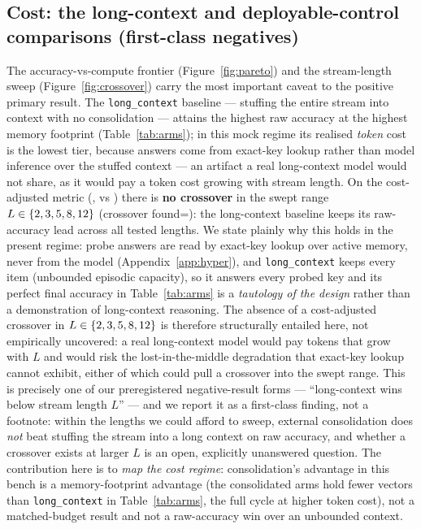 \subsection{Cost: the long-context and deployable-control comparisons (first-class negatives)}
The accuracy-vs-compute frontier (Figure~\ref{fig:pareto}) and the stream-length
sweep (Figure~\ref{fig:crossover}) carry the most important caveat to the
positive primary result. The \texttt{long\_context} baseline --- stuffing the
entire stream into context with no consolidation --- attains the highest raw
accuracy at the highest memory footprint (Table~\ref{tab:arms}); in this mock
regime its realised \emph{token} cost is the lowest tier, because answers come
from exact-key lookup rather than model inference over the stuffed context --- an
artifact a real long-context model would not share, as it would pay a token cost
growing with stream length. On the cost-adjusted metric
(\SWcrossoverMetric{}, \SWcrossoverTreatment{} vs \SWcrossoverBaseline{}) there
is \textbf{no crossover} in the swept range $L\in\{2, 3, 5, 8, 12\}$
(crossover found=\SWcrossoverFound): the long-context baseline keeps its
raw-accuracy lead across all tested lengths. We state plainly why this holds in
the present regime: probe answers are read by exact-key lookup over active memory,
never from the model (Appendix~\ref{app:hyper}), and \texttt{long\_context} keeps
every item (unbounded episodic capacity), so it answers every probed key and its
perfect final accuracy in Table~\ref{tab:arms} is a \emph{tautology of the design}
rather than a demonstration of long-context reasoning. The absence of a
cost-adjusted crossover in $L\in\{2, 3, 5, 8, 12\}$ is therefore structurally
entailed here, not empirically uncovered: a real long-context model would pay
tokens that grow with $L$ and would risk the lost-in-the-middle degradation that
exact-key lookup cannot exhibit, either of which could pull a crossover into the
swept range. This is precisely one of our
preregistered negative-result forms --- ``long-context wins below stream length
$L$'' --- and we report it as a first-class finding, not a footnote: within the
lengths we could afford to sweep, external consolidation does \emph{not} beat
stuffing the stream into a long context on raw accuracy, and whether a crossover
exists at larger $L$ is an open, explicitly unanswered question. The
contribution here is to \emph{map the cost regime}: consolidation's advantage in
this bench is a memory-footprint advantage (the consolidated arms hold fewer
vectors than \texttt{long\_context} in Table~\ref{tab:arms}, the full cycle at
higher token cost), not a matched-budget result and not a raw-accuracy win over an
unbounded context.

